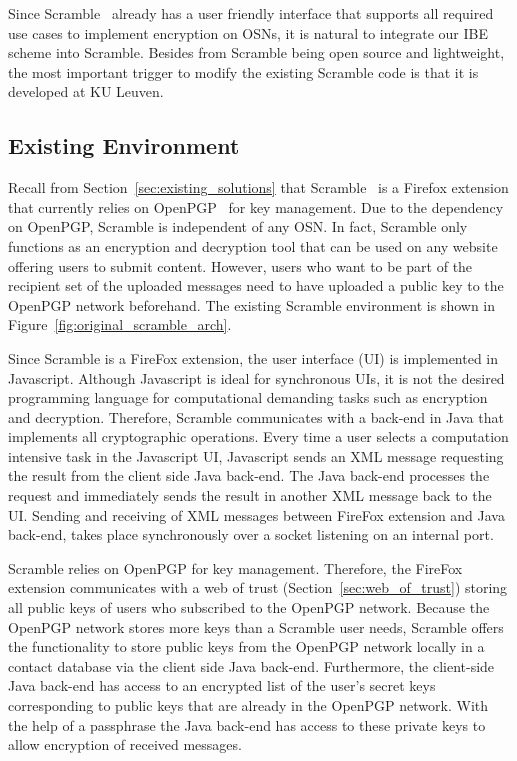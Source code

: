 Since Scramble~\cite{art:BeatoKW11} already has a user friendly interface that supports all required use cases to implement encryption on OSNs, it is natural to integrate our IBE scheme into Scramble. Besides from Scramble being open source and lightweight, the most important trigger to modify the existing Scramble code is that it is developed at KU Leuven.

\subsection{Existing Environment}
Recall from Section~\ref{sec:existing_solutions} that Scramble~\cite{art:BeatoKW11} is a Firefox extension that currently relies on OpenPGP~\cite{rfc4880} for key management. Due to the dependency on OpenPGP, Scramble is independent of any OSN. In fact, Scramble only functions as an encryption and decryption tool that can be used on any website offering users to submit content. However, users who want to be part of the recipient set of the uploaded messages need to have uploaded a public key to the OpenPGP network beforehand. The existing Scramble environment is shown in Figure~\ref{fig:original_scramble_arch}.

Since Scramble is a FireFox extension, the user interface (UI) is implemented in Javascript. Although Javascript is ideal for synchronous UIs, it is not the desired programming language for computational demanding tasks such as encryption and decryption. Therefore, Scramble communicates with a back-end in Java that implements all cryptographic operations. Every time a user selects a computation intensive task in the Javascript UI, Javascript sends an XML message requesting the result from the client side Java back-end. The Java back-end processes the request and immediately sends the result in another XML message back to the UI. Sending and receiving of XML messages between FireFox extension and Java back-end, takes place synchronously over a socket listening on an internal port.

Scramble relies on OpenPGP for key management. Therefore, the FireFox extension communicates with a web of trust (Section~\ref{sec:web_of_trust}) storing all public keys of users who subscribed to the OpenPGP network. Because the OpenPGP network stores more keys than a Scramble user needs, Scramble offers the functionality to store public keys from the OpenPGP network locally in a contact database via the client side Java back-end. Furthermore, the client-side Java back-end has access to an encrypted list of the user's secret keys corresponding to public keys that are already in the OpenPGP network. With the help of a passphrase the Java back-end has access to these private keys to allow encryption of received messages.


